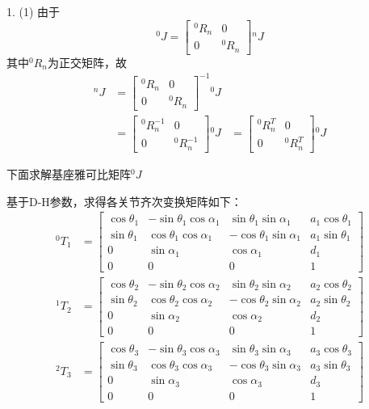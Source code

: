 \documentclass[UTF8, 13pt]{ctexart}
\begin{document}
1.
(1)
由于
\[
{}^0 J = \begin{bmatrix}
            {}^0 R_n & 0 \\
            0 & {}^0 R_n
        \end{bmatrix} {}^n J
\]
其中\({}^0 R_n\)为正交矩阵，故
\[
\begin{aligned}
    {}^n J &= \begin{bmatrix}
            {}^0 R_n & 0 \\
            0 & {}^0 R_n
            \end{bmatrix}^{-1} 
            {}^0 J \\
    &= \begin{bmatrix}
            {}^0 R_n^{-1} & 0 \\
            0 & {}^0 R_n^{-1}
        \end{bmatrix} {}^0 J
    &= \begin{bmatrix}
            {}^0 R_n^T & 0 \\
            0 & {}^0 R_n^T
        \end{bmatrix} {}^0 J
\end{aligned}
\]

下面求解基座雅可比矩阵\({}^0J\)

基于D-H参数，求得各关节齐次变换矩阵如下：
\[
\begin{aligned}
    {}^0 T_1 &= \begin{bmatrix}
                    \cos\theta_1 & -\sin\theta_1\cos\alpha_1 & \sin\theta_1\sin\alpha_1 & a_1\cos\theta_1 \\
                    \sin\theta_1 & \cos\theta_1\cos\alpha_1 & -\cos\theta_1\sin\alpha_1 & a_1\sin\theta_1 \\
                    0 & \sin\alpha_1 & \cos\alpha_1 & d_1 \\
                    0 & 0 & 0 & 1
                \end{bmatrix} \\
    {}^1 T_2 &= \begin{bmatrix}
                    \cos\theta_2 & -\sin\theta_2\cos\alpha_2 & \sin\theta_2\sin\alpha_2 & a_2\cos\theta_2 \\
                    \sin\theta_2 & \cos\theta_2\cos\alpha_2 & -\cos\theta_2\sin\alpha_2 & a_2\sin\theta_2 \\
                    0 & \sin\alpha_2 & \cos\alpha_2 & d_2 \\
                    0 & 0 & 0 & 1
                \end{bmatrix} \\
    {}^2 T_3 &= \begin{bmatrix}
                   \cos\theta_3 & -\sin\theta_3\cos\alpha_3 & \sin\theta_3\sin\alpha_3 & a_3\cos\theta_3 \\
                   \sin\theta_3 & \cos\theta_3\cos\alpha_3 & -\cos\theta_3\sin\alpha_3 & a_3\sin\theta_3 \\
                   0 & \sin\alpha_3 & \cos\alpha_3 & d_3 \\
                   0 & 0 & 0 & 1
               \end{bmatrix} \\
\end{aligned}
\]
\end{document}
